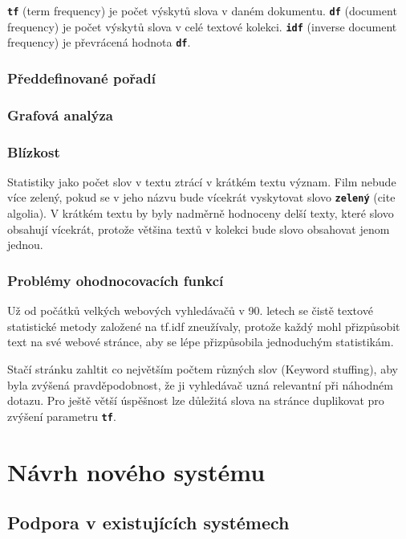\documentclass[11pt,letterpaper,oneside,openright]{book}
\newcommand{\bftt}[1]{\texttt{\textbf{#1}}}
\begin{document}
\bftt{tf} (term frequency) je počet výskytů slova v daném dokumentu. \bftt{df}
(document frequency) je počet výskytů slova v celé textové kolekci. \bftt{idf}
(inverse document frequency) je převrácená hodnota \bftt{df}.

\subsection{Předdefinované pořadí}

\subsection{Grafová analýza}

\subsection{Blízkost}
Statistiky jako počet slov v textu ztrácí v krátkém textu význam. Film
nebude více zelený, pokud se v jeho názvu bude vícekrát vyskytovat slovo
\bftt{zelený} (cite algolia). V krátkém textu by byly nadměrně hodnoceny
delší texty, které slovo obsahují vícekrát, protože většina textů v
kolekci bude slovo obsahovat jenom jednou.

\subsection{Problémy ohodnocovacích funkcí}
Už od počátků velkých webových vyhledávačů v 90. letech se čistě textové
statistické metody založené na tf.idf zneužívaly, protože každý mohl
přizpůsobit text na své webové stránce, aby se lépe přizpůsobila
jednoduchým statistikám.

Stačí stránku zahltit co největším počtem různých slov (Keyword
stuffing), aby byla zvýšená pravděpodobnost, že ji vyhledávač uzná
relevantní při náhodném dotazu. Pro ještě větší úspěšnost lze důležitá
slova na stránce duplikovat pro zvýšení parametru \bftt{tf}.




\chapter{Návrh nového systému}
\section{Podpora v existujících systémech}
\end{document}

